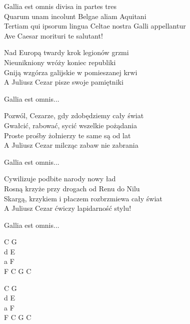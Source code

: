 \begin{text}
	\vin Gallia est omnis divisa in partes tres\\
	\vin Quarum unam incolunt Belgae aliam Aquitani\\
	\vin Tertiam qui ipsorum lingua Celtae nostra Galli appellantur\\
	\vin Ave Caesar morituri te salutant!

	Nad Europą twardy krok legionów grzmi\\
	Nieunikniony wróży koniec republiki\\
	Gniją wzgórza galijskie w pomieszanej krwi\\
	A Juliusz Cezar pisze swoje pamiętniki

	\vin Gallia est omnis...

	Pozwól, Cezarze, gdy zdobędziemy cały świat\\
	Gwałcić, rabować, sycić wszelkie pożądania\\
	Proste prośby żołnierzy te same są od lat\\
	A Juliusz Cezar milcząc zabaw nie zabrania

	\vin Gallia est omnis...

	Cywilizuje podbite narody nowy ład\\
	Rosną krzyże przy drogach od Renu do Nilu\\
	Skargą, krzykiem i płaczem rozbrzmiewa cały świat\\
	A Juliusz Cezar ćwiczy lapidarność stylu!

	\vin Gallia est omnis...
\end{text}
\begin{chord}
    C G\\
    d E\\
    a F\\
    F C G C
    
    C G\\
    d E\\
    a F\\
    F C G C
\end{chord}
